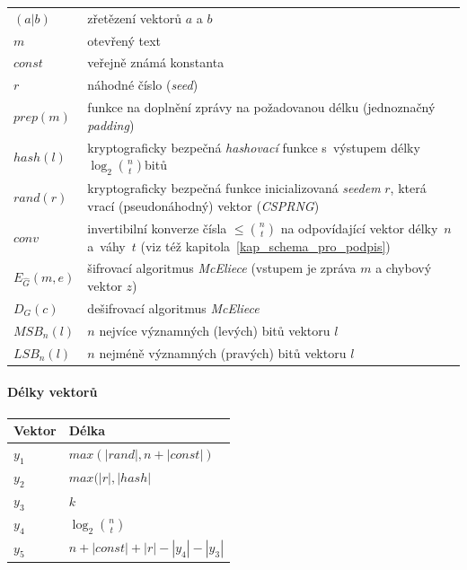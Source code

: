 \documentclass[thesis=M,czech,hidelinks]{FITthesis}[2012/06/26]
\newcommand{\0}{{\textcolor[gray]{0.80}{0}}}
\begin{document}
\begin{center}
\begin{tabular}{l p{10cm}}
    $(a|b)$         &   zřetězení vektorů $a$ a $b$ \\
    $m$             &   otevřený text \\
    $const$         &   veřejně známá konstanta \\
    $r$             &   náhodné číslo (\emph{seed}) \\
    $prep(m)$       &   funkce na doplnění zprávy na požadovanou délku
                        (jednoznačný \emph{padding}) \\
    $hash(l)$       &   kryptograficky bezpečná \emph{hashovací} funkce
                        s~výstupem délky $\log_2 \binom{n}{t}$\;bitů \\
    $rand(r)$       &   kryptograficky bezpečná funkce inicializovaná
                        \emph{seedem} $r$, která vrací (pseudonáhodný) vektor
                        (\emph{CSPRNG}) \\
    $conv$          &   invertibilní konverze čísla $\leq \binom{n}{t}$ na
                        odpovídající vektor délky~$n$ a~váhy~$t$ (viz též
                        kapitola~\ref{kap_schema_pro_podpis}) \\
    $E_{\hat{G}}(m,e)$
                    &   šifrovací algoritmus \emph{McEliece} (vstupem je
                        zpráva $m$ a chybový vektor $z$) \\
    $D_G(c)$        &   dešifrovací algoritmus \emph{McEliece} \\
    $MSB_n(l)$      &   $n$ nejvíce významných (levých) bitů vektoru $l$ \\
    $LSB_n(l)$      &   $n$ nejméně významných (pravých) bitů vektoru $l$ \\
\end{tabular}
\end{center}

\paragraph{Délky vektorů}

\begin{center}
\begin{tabular}{l l}
    Vektor      & Délka                                 \\
    \hline
    $y_1$       & $max(|rand|, n+|const|)$              \\
    $y_2$       & $max(|r|,|hash|$                      \\
    $y_3$       & $k$                                   \\
    $y_4$       & $\log_2 \binom{n}{t}$                 \\
    $y_5$       & $n + |const| + |r| - |y_4| - |y_3|$   \\
\end{tabular}
\end{center}
\end{document}
